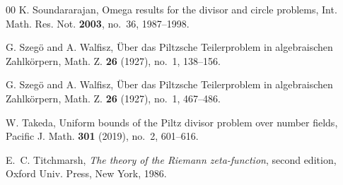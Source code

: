 \documentclass[reqno]{amsart}
\numberwithin{equation}{section}
\theoremstyle{plain}
\begin{document}
\begin{thebibliography}{00}
		 K. Soundararajan, {Omega results for the divisor and circle problems}, Int. Math. Res. Not. {\bf 2003}, no.~36, 1987--1998.
		
		 G. Szeg\"o{} and A. Walfisz, \"Uber das Piltzsche Teilerproblem in algebraischen Zahlk\"orpern, Math. Z. {\bf 26} (1927), no.~1, 138--156.
		
		 G. Szeg\"o{} and A. Walfisz, \"Uber das Piltzsche Teilerproblem in algebraischen Zahlk\"orpern, Math. Z. {\bf 26} (1927), no.~1, 467--486.
		
		 W. Takeda, Uniform bounds of the Piltz divisor problem over number fields, Pacific J. Math. {\bf 301} (2019), no.~2, 601--616.
		
		
		 E.~C. Titchmarsh, {\it The theory of the Riemann zeta-function}, second edition, 
		Oxford Univ. Press, New York, 1986.
%		
	\end{thebibliography}
	
\end{document}
